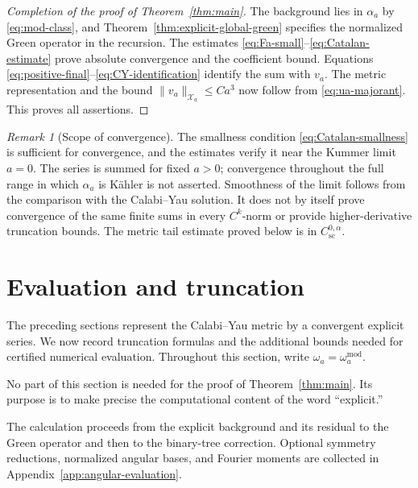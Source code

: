\documentclass[11pt,a4paper,twoside]{article}
\numberwithin{equation}{section}
\theoremstyle{definition}
\theoremstyle{remark}
\newtheorem{remark}[theorem]{Remark}
\begin{document}
\begin{proof}[Completion of the proof of Theorem~\ref{thm:main}]
The background lies in \(\alpha_a\) by \eqref{eq:mod-class},
and Theorem~\ref{thm:explicit-global-green} specifies the normalized
Green operator in the recursion. The estimates
\eqref{eq:Fa-small}--\eqref{eq:Catalan-estimate} prove absolute
convergence and the coefficient bound. Equations
\eqref{eq:positive-final}--\eqref{eq:CY-identification} identify
the sum with \(v_a\). The metric representation and the bound
\(\|v_a\|_{\mathcal X_a}\le Ca^3\) now follow from
\eqref{eq:ua-majorant}. This proves all assertions.
\end{proof}


\begin{remark}[Scope of convergence]
\label{rem:fixed-a-convergence}
The smallness condition \eqref{eq:Catalan-smallness} is sufficient
for convergence, and the estimates verify it near the Kummer limit
\(a=0\). The series is summed for fixed \(a>0\); convergence
throughout the full range in which \(\alpha_a\) is K\"ahler is
not asserted. Smoothness of the limit follows from the comparison
with the Calabi--Yau solution. It does not by itself prove convergence
of the same finite sums in every \(C^k\)-norm or provide
higher-derivative truncation bounds. The metric tail estimate proved
below is in \(C_{\mathrm{sc}}^{0,\alpha}\).
\end{remark}

\section{Evaluation and truncation}
\label{sec:computational-realization}

The preceding sections represent the Calabi--Yau metric by a
convergent explicit series. We now record truncation formulas and
the additional bounds needed for certified numerical evaluation.
Throughout this section, write \(\omega_a=\omega_a^{\mathrm{mod}}\).

No part of this section is needed for the proof of
Theorem~\ref{thm:main}.  Its purpose is to make precise the
computational content of the word ``explicit.''

The calculation proceeds from the explicit background and its residual
to the Green operator and then to the binary-tree correction.
Optional symmetry reductions, normalized angular bases, and Fourier
moments are collected in Appendix~\ref{app:angular-evaluation}.
\end{document}
